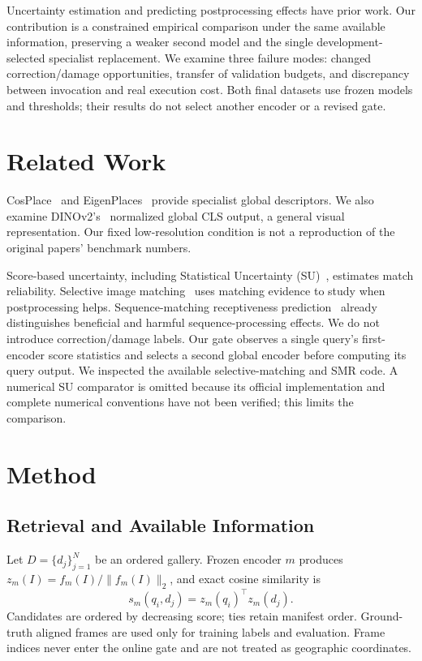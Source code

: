 \documentclass[conference]{IEEEtran}
\begin{document}
Uncertainty estimation and predicting postprocessing effects have prior
work. Our contribution is a constrained empirical comparison under the
same available information, preserving a weaker second model and the
single development-selected specialist replacement. We examine three
failure modes: changed correction/damage opportunities, transfer of
validation budgets, and discrepancy between invocation and real execution
cost. Both final datasets use frozen models and thresholds; their results
do not select another encoder or a revised gate.

\section{Related Work}
CosPlace~\cite{cosplace} and EigenPlaces~\cite{eigenplaces} provide
specialist global descriptors. We also examine DINOv2's~\cite{dinov2}
normalized global CLS output, a general visual representation. Our fixed low-resolution condition is
not a reproduction of the original papers' benchmark numbers.

Score-based uncertainty, including Statistical Uncertainty
(SU)~\cite{doubt}, estimates match reliability. Selective image
matching~\cite{match} uses matching evidence to study when postprocessing
helps. Sequence-matching receptiveness prediction~\cite{smr} already
distinguishes beneficial and harmful sequence-processing effects. We do
not introduce correction/damage labels. Our gate observes a single
query's first-encoder score statistics and selects a second global
encoder before computing its query output. We inspected the available
selective-matching and SMR code. A numerical SU comparator is omitted
because its official implementation and complete numerical conventions
have not been verified; this limits the comparison.

\section{Method}
\subsection{Retrieval and Available Information}
Let $D=\{d_j\}_{j=1}^{N}$ be an ordered gallery. Frozen encoder $m$ produces
$z_m(I)=f_m(I)/\|f_m(I)\|_2$, and exact cosine similarity is
\begin{equation}
s_m(q_i,d_j)=z_m(q_i)^\top z_m(d_j).
\end{equation}
Candidates are ordered by decreasing score; ties retain manifest order.
Ground-truth aligned frames are used only for training labels and
evaluation. Frame indices never enter the online gate and are not treated
as geographic coordinates.
\end{document}
